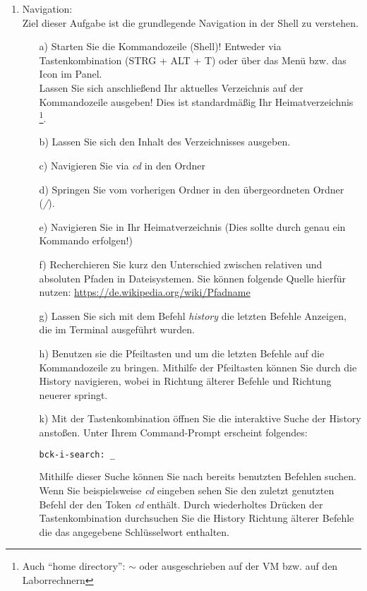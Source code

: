 \documentclass[paper=a4,fontsize=11pt]{scrartcl}%
\numberwithin{equation}{section}
\begin{document}
\begin{enumerate}
\item Navigation:\\
Ziel dieser Aufgabe ist die grundlegende Navigation in der Shell zu verstehen.
	\begin{itemize}
		\item[a)] Starten Sie die Kommandozeile (Shell)! Entweder via Tastenkombination  (STRG + ALT + T) oder über das Menü bzw. das Icon im Panel.\\
		Lassen Sie sich anschließend Ihr aktuelles Verzeichnis auf der Kommandozeile ausgeben! Dies ist standardmäßig Ihr Heimatverzeichnis \footnote{Auch \enquote{home directory}: $\sim$ oder ausgeschrieben  auf der VM bzw.  auf den Laborrechnern}.
		\item[b)] Lassen Sie sich den Inhalt des Verzeichnisses ausgeben.
		\item[c)] Navigieren Sie via \emph{cd} in den Ordner 
		\item[d)] Springen Sie vom vorherigen Ordner in den übergeordneten Ordner (\emph{/}).
		\item[e)] Navigieren Sie in Ihr Heimatverzeichnis (Dies sollte durch genau ein Kommando erfolgen!)
		\item[f)] Recherchieren Sie kurz den Unterschied zwischen relativen und absoluten Pfaden in Dateisystemen. Sie können folgende Quelle hierfür nutzen: \url{https://de.wikipedia.org/wiki/Pfadname}
		\item[g)] Lassen Sie sich mit dem Befehl \emph{history} die letzten Befehle Anzeigen, die im Terminal ausgeführt wurden. 
		\item[h)] Benutzen sie die Pfeiltasten \keys{\arrowkeyup} und \keys{\arrowkeydown} um die letzten Befehle auf die Kommandozeile zu bringen. Mithilfe der Pfeiltasten können Sie durch die History navigieren, wobei \keys{\arrowkeyup} in Richtung älterer Befehle und \keys{\arrowkeydown} Richtung neuerer springt.
		\item[k)] Mit der Tastenkombination  öffnen Sie die interaktive Suche der History anstoßen. Unter Ihrem Command-Prompt erscheint folgendes:\\
		\begin{lstlisting}[style=Bash, language=Bash]
bck-i-search: _
		\end{lstlisting}
		Mithilfe dieser Suche können Sie nach bereits benutzten Befehlen suchen. Wenn Sie beispielsweise \emph{cd} eingeben sehen Sie den zuletzt genutzten Befehl der den Token \emph{cd} enthält. Durch wiederholtes Drücken der Tastenkombination  durchsuchen Sie die History Richtung älterer Befehle die das angegebene Schlüsselwort enthalten.\\

\end{itemize}
\end{enumerate}
\end{document}
